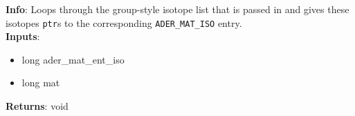 \textbf{Info}: Loops through the group-style isotope list that is passed
in and gives these isotopes \texttt{ptr}s to the corresponding
\verb|ADER_MAT_ISO| entry.\\

\noindent \textbf{Inputs}:
\begin{itemize}
\item{long ader\_mat\_ent\_iso}
\item{long mat}
\end{itemize}

\noindent \textbf{Returns}: void

